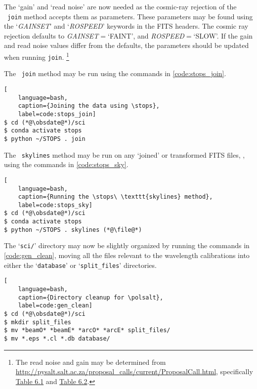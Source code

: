 The `gain' and `read noise' are now needed as the cosmic-ray rejection of the \stops\ \texttt{join} method accepts them as parameters. These parameters may be found using the `\textit{GAINSET}' and `\textit{ROSPEED}' keywords in the \gls{FITS} headers. The cosmic ray rejection defaults to \textit{GAINSET}$ = $`FAINT', and \textit{ROSPEED}$ = $`SLOW'. If the gain and read noise values differ from the defaults, the parameters should be updated when running \texttt{join}.%
\footnote{The read noise and gain may be determined from \protect\url{http://pysalt.salt.ac.za/proposal_calls/current/ProposalCall.html}, specifically \href{http://pysalt.salt.ac.za/proposal_calls/current/ProposalCall.html\#t.4}{Table 6.1} and \href{http://pysalt.salt.ac.za/proposal_calls/current/ProposalCall.html\#t.5}{Table 6.2}.}

\pagebreak

The \stops\ \texttt{join} method may be run using the commands in \autoref{code:stops_join}.

\begin{lstlisting}[
    language=bash,
    caption={Joining the data using \stops},
    label=code:stops_join]
$ cd (*@\obsdate@*)/sci
$ conda activate stops
$ python ~/STOPS . join
\end{lstlisting}

The \stops\ \texttt{skylines} method may be run on any `joined' or transformed \gls{FITS} files, \file, using the commands in \autoref{code:stops_sky}.

\begin{lstlisting}[
    language=bash,
    caption={Running the \stops\ \texttt{skylines} method},
    label=code:stops_sky]
$ cd (*@\obsdate@*)/sci
$ conda activate stops
$ python ~/STOPS . skylines (*@\file@*)
\end{lstlisting}

The `\texttt{sci/}' directory may now be slightly organized by running the commands in \autoref{code:gen_clean}, moving all the files relevant to the wavelength calibrations into either the `\texttt{database}' or `\texttt{split\_files}' directories.

\begin{lstlisting}[
    language=bash,
    caption={Directory cleanup for \polsalt},
    label=code:gen_clean]
$ cd (*@\obsdate@*)/sci
$ mkdir split_files
$ mv *beamO* *beamE* *arcO* *arcE* split_files/
$ mv *.eps *.cl *.db database/
\end{lstlisting}

